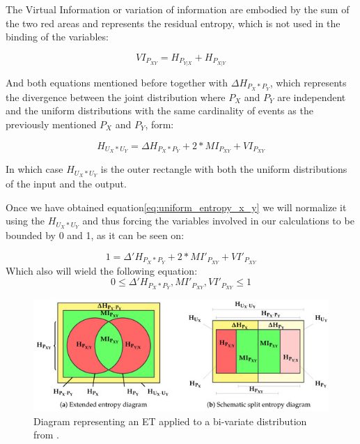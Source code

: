 The Virtual Information or variation of information are embodied by the sum of the two red areas and represents the residual entropy, which is not used in the binding of the variables:

\begin{equation}\label{eq:virtual_information}
VI_{P_{XY}} = H_{P_{Y|X}} + H_{P_{X|Y}}
\end{equation}

And both equations mentioned before together with $\Delta H_{P_{X} * P_{Y}}$, which represents the divergence between the joint distribution where $P_X$ and $P_Y$ are independent and the uniform distributions with the same cardinality of events as the previously mentioned $P_X$ and $P_Y$, form:

\begin{equation}\label{eq:uniform_entropy_x_y}
H_{U_{X} * U_{Y}} = \Delta H_{P_{X} * P_{Y}} + 2 * MI_{P_{XY}} + VI_{P_{XY}}
\end{equation}

In which case $H_{U_{X} * U_{Y}}$ is the outer rectangle with both the uniform distributions of the input and the output.

Once we have obtained equation\ref{eq:uniform_entropy_x_y} we will normalize it using the  $H_{U_{X} * U_{Y}}$ and thus forcing the variables involved in our calculations to be bounded by 0 and 1, as it can be seen on:

\begin{equation}\label{eq:normalised_uniformed}
1 = \Delta'H_{P_{X} * P_{Y}} + 2 * MI'_{P_{XY}} + VI'_{P_{XY}} 
\end{equation}
Which also will wield the following equation:
\begin{equation}\label{eq:complex_space_equation}
0 \leq \Delta'H_{P_{X} * P_{Y}}, MI'_{P_{XY}}, VI'_{P_{XY}}  \leq 1
\end{equation}
\newline
\begin{figure}[H]
 \centering
  \includegraphics[width=14cm]{Figuras_tfg/ET_Diagram}
  \caption{Diagram representing an ET applied to a bi-variate distribution from \cite{val:pel:18c}.}
 \label{fig:figure_diagram_et}
\end{figure} 


